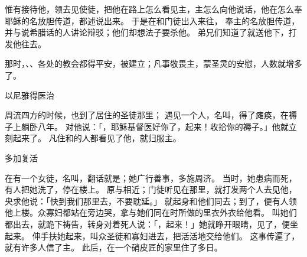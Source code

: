 {惟有{}接待他，领去见使徒，把他在路上怎么看见主，主怎么向他说话，他在{}怎么奉耶稣的名放胆传道，都述说出来。
于是{}在{}和门徒出入来往，
奉主的名放胆传道，并与说希腊话的{}人讲论辩驳；他们却想法子要杀他。
弟兄们知道了就送他下{}，打发他往{}去。
\par }{\PP {}那时，{}、{}、{}各处的教会都得平安，被建立；凡事敬畏主，蒙圣灵的安慰，人数就增多了。
\par }{\SH 以尼雅得医治
\par }{\PP {}周流四方的时候，也到了居住{}的圣徒那里；
遇见一个人，名叫{}，得了瘫痪，在褥子上躺卧八年。
对他说：「{}，耶稣基督医好你了，起来！收拾你的褥子。」他就立刻起来了。
凡住{}和{}的人都看见了他，就归服主。
\par }{\SH 多加复活
\par }{\PP {}在{}有一个女徒，名叫{}，翻{}话就是{}；她广行善事，多施周济。
当时，她患病而死，有人把她洗了，停在楼上。
原与{}相近；门徒听见{}在那里，就打发两个人去见他，央求他说：「快到我们那里去，不要耽延。」
就起身和他们同去；到了，便有人领他上楼。众寡妇都站在{}旁边哭，拿{}与她们同在时所做的里衣外衣给他看。
叫她们都出去，就跪下祷告，转身对着死人说：「{}，起来！」她就睁开眼睛，见了{}，便坐起来。
伸手扶她起来，叫众圣徒和寡妇进去，把{}活活地交给他们。
这事传遍了{}，就有许多人信了主。
此后，{}在{}一个硝皮匠{}的家里住了多日。

}
